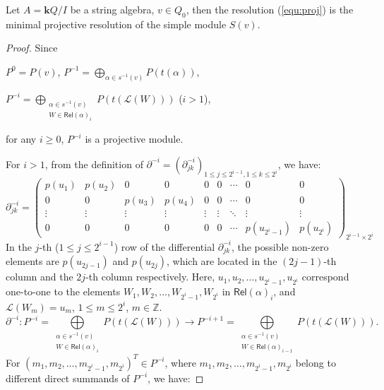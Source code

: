 \documentclass[10pt,a4paper]{amsart}
\begin{document}
\begin{lemma}\label{lem:proj-formula}
	Let \( A = \mathbf{k}Q/I \) be a string algebra, \( v \in Q_0 \), then the resolution (\ref{equ:proj}) is the minimal projective resolution of the simple module \( S(v) \).
\end{lemma}

\begin{proof}
	Since 
	\begin{center}
		\( P^0 = P(v) \), \( P^{-1} = \bigoplus\limits_{\alpha \in s^{-1}(v)} P(t(\alpha)) \), 
		
		\( P^{-i} = \bigoplus\limits_{\substack{\alpha \in s^{-1}(v) \\ W \in \mathsf{Rel}(\alpha)_i}} P(t(\mathscr{L}(W))) \) (\( i > 1 \)),
	\end{center}
	 for any \( i \geq 0 \), \( P^{-i} \) is a projective module.
	
	For \( i > 1 \), from the definition of \( \partial^{-i} = (\partial^{-i}_{jk})_{1 \leq j \leq 2^{i- 1 }, 1 \leq k \leq 2^i} \), we have:
	\[
	\partial^{-i}_{jk} = \begin{pmatrix}
		p(u_1) & p(u_2) & 0 & 0 & 0 & 0 & \cdots & 0 & 0 \\
		0 & 0 & p(u_3) & p(u_4) & 0 & 0 & \cdots & 0 & 0 \\
		\vdots & \vdots & \vdots & \vdots & \vdots & \vdots & \ddots & \vdots & \vdots \\
		0 & 0 & 0 & 0 & 0 & 0 & \cdots & p(u_{2^i - 1}) & p(u_{2^i})
	\end{pmatrix}_{2^{i- 1 } \times 2^i}
	\]
	In the \( j \)-th (\( 1 \leq j \leq 2^{i- 1 } \)) row of the differential \( \partial^{-i}_{jk} \), the possible non-zero elements are \( p(u_{2j - 1}) \) and \( p(u_{2j}) \), which are located in the \( (2j - 1) \)-th column and the \( 2j \)-th column respectively. Here, \( u_1, u_2, \ldots, u_{2^i - 1}, u_{2^i} \) correspond one-to-one to the elements \( W_1, W_2, \ldots, W_{2^i - 1}, W_{2^i} \) in \( \mathsf{Rel}(\alpha)_i \), and \( \mathscr{L}(W_m) = u_m \), \( 1 \leq m \leq 2^i \), \( m \in \mathbb{Z} \).
	\[
	\partial^{-i}: P^{-i} = \bigoplus\limits_{\substack{\alpha \in s^{-1}(v) \\ W \in \mathsf{Rel}(\alpha)_i}} P(t(\mathscr{L}(W))) \longrightarrow P^{-i + 1} = \bigoplus\limits_{\substack{\alpha \in s^{-1}(v) \\ W \in \mathsf{Rel}(\alpha)_{i - 1}}} P(t(\mathscr{L}(W))).
	\]
	For \( (m_1, m_2, \ldots, m_{2^i - 1}, m_{2^i})^T \in P^{-i} \), where \( m_1, m_2, \ldots, m_{2^i - 1}, m_{2^i} \) belong to different direct summands of \( P^{-i} \), we have:
	

\end{proof}
\end{document}
